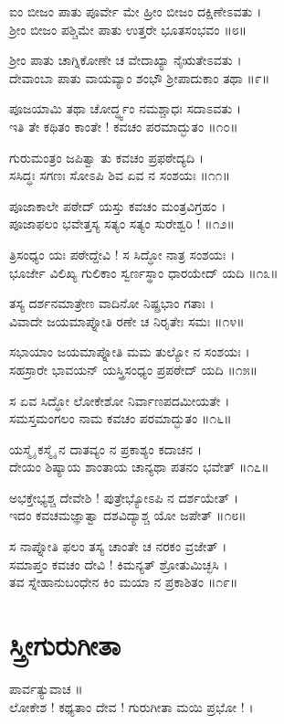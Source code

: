 ಐಂ ಬೀಜಂ ಪಾತು ಪೂರ್ವೇ ಮೇ ಹ್ರೀಂ ಬೀಜಂ ದಕ್ಷಿಣೇಽವತು ।\\
ಶ್ರೀಂ ಬೀಜಂ ಪಶ್ಚಿಮೇ ಪಾತು ಉತ್ತರೇ ಭೂತಸಂಭವಂ ॥೮॥

ಶ್ರೀಂ ಪಾತು ಚಾಗ್ನಿಕೋಣೇ ಚ ವೇದಾಖ್ಯಾ ನೈಋತೇಽವತು ।\\
ದೇವಾಂಬಾ ಪಾತು ವಾಯವ್ಯಾಂ ಶಂಭೌ ಶ್ರೀಪಾದುಕಾಂ ತಥಾ ॥೯॥

ಪೂಜಯಾಮಿ ತಥಾ ಚೋರ್ದ್ಧ್ವಂ ನಮಶ್ಚಾಧಃ ಸದಾಽವತು ।\\
ಇತಿ ತೇ ಕಥಿತಂ ಕಾಂತೇ ! ಕವಚಂ ಪರಮಾದ್ಭುತಂ ॥೧೦॥

ಗುರುಮಂತ್ರಂ ಜಪಿತ್ವಾ ತು ಕವಚಂ ಪ್ರಫಠೇದ್ಯದಿ ।\\
ಸಸಿದ್ಧಃ ಸಗಣಃ ಸೋಽಪಿ ಶಿವ ಏವ ನ ಸಂಶಯಃ ॥೧೧॥

ಪೂಜಾಕಾಲೇ ಪಠೇದ್ ಯಸ್ತು ಕವಚಂ ಮಂತ್ರವಿಗ್ರಹಂ ।\\
ಪೂಜಾಫಲಂ ಭವೇತ್ತಸ್ಯ ಸತ್ಯಂ ಸತ್ಯಂ ಸುರೇಶ್ವರಿ ! ॥೧೨॥

ತ್ರಿಸಂಧ್ಯಂ ಯಃ ಪಠೇದ್ದೇವಿ ! ಸ ಸಿದ್ಧೋ ನಾತ್ರ ಸಂಶಯಃ ।\\
ಭೂರ್ಜೇ ವಿಲಿಖ್ಯ ಗುಲಿಕಾಂ ಸ್ವರ್ಣಸ್ಥಾಂ ಧಾರಯೇದ್ ಯದಿ ॥೧೩॥

ತಸ್ಯ ದರ್ಶನಮಾತ್ರೇಣ ವಾದಿನೋ ನಿಷ್ಪ್ರಭಾಂ ಗತಾಃ ।\\
ವಿವಾದೇ ಜಯಮಾಪ್ನೋತಿ ರಣೇ ಚ ನಿರೃತೇಃ ಸಮಃ ॥೧೪॥

ಸಭಾಯಾಂ ಜಯಮಾಪ್ನೋತಿ ಮಮ ತುಲ್ಯೋ ನ ಸಂಶಯಃ ।\\
ಸಹಸ್ರಾರೇ ಭಾವಯನ್ ಯಸ್ತ್ರಿಸಂಧ್ಯಂ ಪ್ರಪಠೇದ್ ಯದಿ ॥೧೫॥

ಸ ಏವ ಸಿದ್ಧೋ ಲೋಕೇಶೋ ನಿರ್ವಾಣಪದಮೀಯತೇ ।\\
ಸಮಸ್ತಮಂಗಲಂ ನಾಮ ಕವಚಂ ಪರಮಾದ್ಭುತಂ ॥೧೬॥

ಯಸ್ಮೈ ಕಸ್ಮೈ ನ ದಾತವ್ಯಂ ನ ಪ್ರಕಾಶ್ಯಂ ಕದಾಚನ ।\\
ದೇಯಂ ಶಿಷ್ಯಾಯ ಶಾಂತಾಯ ಚಾನ್ಯಥಾ ಪತನಂ ಭವೇತ್ ॥೧೭॥

ಅಭಕ್ತೇಭ್ಯಶ್ಚ ದೇವೇಶಿ ! ಪುತ್ರೇಭ್ಯೋಽಪಿ ನ ದರ್ಶಯೇತ್ ।\\
ಇದಂ ಕವಚಮಜ್ಞಾತ್ವಾ ದಶವಿದ್ಯಾಶ್ಚ ಯೋ ಜಪೇತ್ ॥೧೮॥

ಸ ನಾಪ್ನೋತಿ ಫಲಂ ತಸ್ಯ ಚಾಂತೇ ಚ ನರಕಂ ವ್ರಜೇತ್ ।\\
ಸಮಾಪ್ತಂ ಕವಚಂ ದೇವಿ ! ಕಿಮನ್ಯತ್ ಶ್ರೋತುಮಿಚ್ಛಸಿ ।\\
ತವ ಸ್ನೇಹಾನುಬಂಧೇನ ಕಿಂ ಮಯಾ ನ ಪ್ರಕಾಶಿತಂ ॥೧೯॥


\section{ ಸ್ತ್ರೀಗುರುಗೀತಾ }

ಪಾರ್ವತ್ಯುವಾಚ ॥\\
ಲೋಕೇಶ ! ಕಥ್ಯತಾಂ ದೇವ ! ಗುರುಗೀತಾ ಮಯಿ ಪ್ರಭೋ ! ।\\

